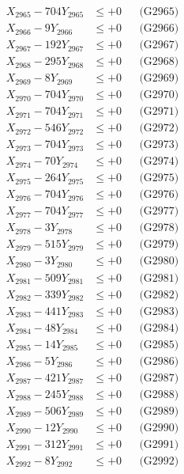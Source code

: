 \documentclass[a4paper,10pt]{article}
\begin{document}
{\begin{align}
X_{2965} - 704Y_{2965} &\leq +0 && \text{(G2965)} \\
X_{2966} - 9Y_{2966} &\leq +0 && \text{(G2966)} \\
X_{2967} - 192Y_{2967} &\leq +0 && \text{(G2967)} \\
X_{2968} - 295Y_{2968} &\leq +0 && \text{(G2968)} \\
X_{2969} - 8Y_{2969} &\leq +0 && \text{(G2969)} \\
X_{2970} - 704Y_{2970} &\leq +0 && \text{(G2970)} \\
\allowbreak
X_{2971} - 704Y_{2971} &\leq +0 && \text{(G2971)} \\
X_{2972} - 546Y_{2972} &\leq +0 && \text{(G2972)} \\
X_{2973} - 704Y_{2973} &\leq +0 && \text{(G2973)} \\
X_{2974} - 70Y_{2974} &\leq +0 && \text{(G2974)} \\
X_{2975} - 264Y_{2975} &\leq +0 && \text{(G2975)} \\
X_{2976} - 704Y_{2976} &\leq +0 && \text{(G2976)} \\
X_{2977} - 704Y_{2977} &\leq +0 && \text{(G2977)} \\
X_{2978} - 3Y_{2978} &\leq +0 && \text{(G2978)} \\
X_{2979} - 515Y_{2979} &\leq +0 && \text{(G2979)} \\
X_{2980} - 3Y_{2980} &\leq +0 && \text{(G2980)} \\
\allowbreak
X_{2981} - 509Y_{2981} &\leq +0 && \text{(G2981)} \\
X_{2982} - 339Y_{2982} &\leq +0 && \text{(G2982)} \\
X_{2983} - 441Y_{2983} &\leq +0 && \text{(G2983)} \\
X_{2984} - 48Y_{2984} &\leq +0 && \text{(G2984)} \\
X_{2985} - 14Y_{2985} &\leq +0 && \text{(G2985)} \\
X_{2986} - 5Y_{2986} &\leq +0 && \text{(G2986)} \\
X_{2987} - 421Y_{2987} &\leq +0 && \text{(G2987)} \\
X_{2988} - 245Y_{2988} &\leq +0 && \text{(G2988)} \\
X_{2989} - 506Y_{2989} &\leq +0 && \text{(G2989)} \\
X_{2990} - 12Y_{2990} &\leq +0 && \text{(G2990)} \\
\allowbreak
X_{2991} - 312Y_{2991} &\leq +0 && \text{(G2991)} \\
X_{2992} - 8Y_{2992} &\leq +0 && \text{(G2992)} \\

\end{align}}
\end{document}
